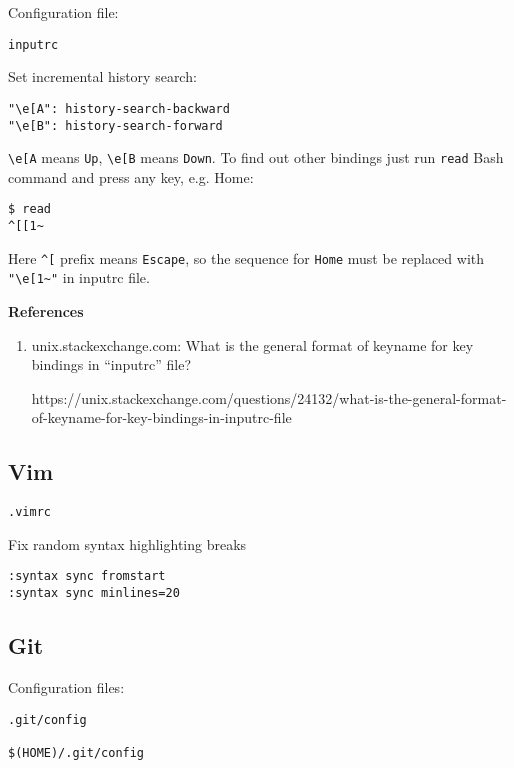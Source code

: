 \documentclass[12pt,a4paper]{article}
\begin{document}
Configuration file:

\begin{verbatim}
inputrc
\end{verbatim}

Set incremental history search:
\begin{verbatim}
"\e[A": history-search-backward
"\e[B": history-search-forward
\end{verbatim}

\verb"\e[A" means \verb"Up", \verb"\e[B" means \verb"Down".  To find out other 
bindings just run \verb"read" Bash command and press any key, e.g. Home:
\begin{verbatim}
$ read
^[[1~
\end{verbatim}

Here \verb"^[" prefix means \verb"Escape", so the sequence for \verb"Home" must 
be replaced with \verb'"\e[1~"' in inputrc file.

\textbf{References}

\begin{enumerate}
\item unix.stackexchange.com: What is the general format of keyname for key 
bindings in “inputrc” file?

	https://unix.stackexchange.com/questions/24132/what-is-the-general-format-of-keyname-for-key-bindings-in-inputrc-file
\end{enumerate}

\subsection{Vim}

\begin{verbatim}
.vimrc
\end{verbatim}

Fix random syntax highlighting breaks

\begin{verbatim}
:syntax sync fromstart
:syntax sync minlines=20
\end{verbatim}

\subsection{Git}

Configuration files:

\begin{verbatim}
.git/config

$(HOME)/.git/config
\end{verbatim}
\end{document}
